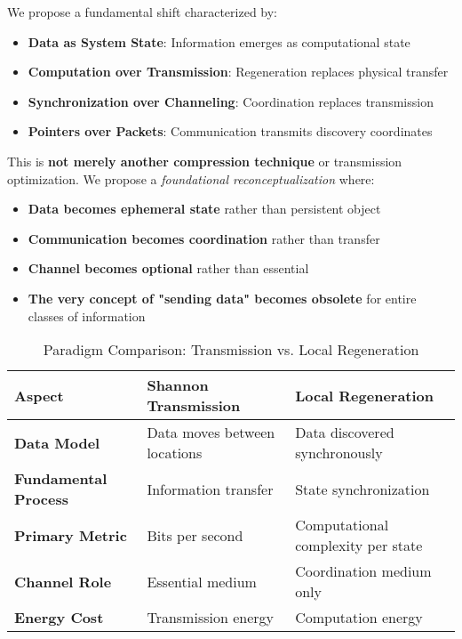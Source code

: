 \documentclass[11pt,a4paper]{article}
\begin{document}
We propose a fundamental shift characterized by:

\begin{itemize}
    \item \textbf{Data as System State}: Information emerges as computational state
    \item \textbf{Computation over Transmission}: Regeneration replaces physical transfer
    \item \textbf{Synchronization over Channeling}: Coordination replaces transmission
    \item \textbf{Pointers over Packets}: Communication transmits discovery coordinates
\end{itemize}

\noindent This is \textbf{not merely another compression technique} or transmission optimization. We propose a \emph{foundational reconceptualization} where:

\begin{itemize}
    \item \textbf{Data becomes ephemeral state} rather than persistent object
    \item \textbf{Communication becomes coordination} rather than transfer
    \item \textbf{Channel becomes optional} rather than essential
    \item \textbf{The very concept of "sending data" becomes obsolete} for entire classes of information
\end{itemize}

\begin{table}[h]
\centering
\caption{Paradigm Comparison: Transmission vs. Local Regeneration}
\begin{tabularx}{\textwidth}{|l|X|X|}
\hline
\textbf{Aspect} & \textbf{Shannon Transmission} & \textbf{Local Regeneration} \\
\hline
\textbf{Data Model} & Data moves between locations & Data discovered synchronously \\
\hline
\textbf{Fundamental Process} & Information transfer & State synchronization \\
\hline
\textbf{Primary Metric} & Bits per second & Computational complexity per state \\
\hline
\textbf{Channel Role} & Essential medium & Coordination medium only \\
\hline
\textbf{Energy Cost} & Transmission energy & Computation energy \\
\hline
\end{tabularx}
\end{table}
\end{document}
